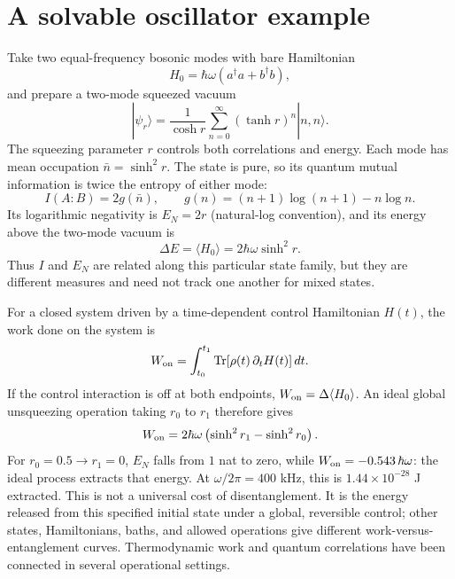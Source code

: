 \documentclass[9pt]{article}
\begin{document}
\section{A solvable oscillator example}
Take two equal-frequency bosonic modes with bare Hamiltonian
\begin{equation}
 H_0=\hbar\omega(a^\dagger a+b^\dagger b),
\end{equation}
and prepare a two-mode squeezed vacuum
\begin{equation}
 |\psi_r\rangle=\frac{1}{\cosh r}\sum_{n=0}^{\infty}(\tanh r)^n|n,n\rangle.
\end{equation}
The squeezing parameter $r$ controls both correlations and energy. Each mode has mean occupation $\bar n=\sinh^2r$. The state is pure, so its quantum mutual information is twice the entropy of either mode:
\begin{equation}
 I(A\!:\!B)=2g(\bar n),\qquad
 g(n)=(n+1)\log(n+1)-n\log n.
\end{equation}
Its logarithmic negativity is $E_N=2r$ (natural-log convention), and its energy above the two-mode vacuum is
\begin{equation}
 \Delta E=\langle H_0\rangle=2\hbar\omega\sinh^2r.
\end{equation}
Thus $I$ and $E_N$ are related along this particular state family, but they are different measures and need not track one another for mixed states.

For a closed system driven by a time-dependent control Hamiltonian $H(t)$, the work done on the system is
\begin{equation}
 W_{\rm on}=\int_{t_0}^{t_1}\operatorname{Tr}[\rho(t)\,\partial_t H(t)]\,dt.
\end{equation}
If the control interaction is off at both endpoints, $W_{\rm on}=\Delta\langle H_0\rangle$. An ideal global unsqueezing operation taking $r_0$ to $r_1$ therefore gives
\begin{equation}
 W_{\rm on}=2\hbar\omega\left(\sinh^2r_1-\sinh^2r_0\right).
\end{equation}
For $r_0=0.5\to r_1=0$, $E_N$ falls from $1$ nat to zero, while $W_{\rm on}=-0.543\,\hbar\omega$: the ideal process extracts that energy. At $\omega/2\pi=400$ kHz, this is $1.44\times10^{-28}$ J extracted. This is not a universal cost of disentanglement. It is the energy released from this specified initial state under a global, reversible control; other states, Hamiltonians, baths, and allowed operations give different work-versus-entanglement curves. Thermodynamic work and quantum correlations have been connected in several operational settings.\cite{oppenheim2002}
\end{document}

